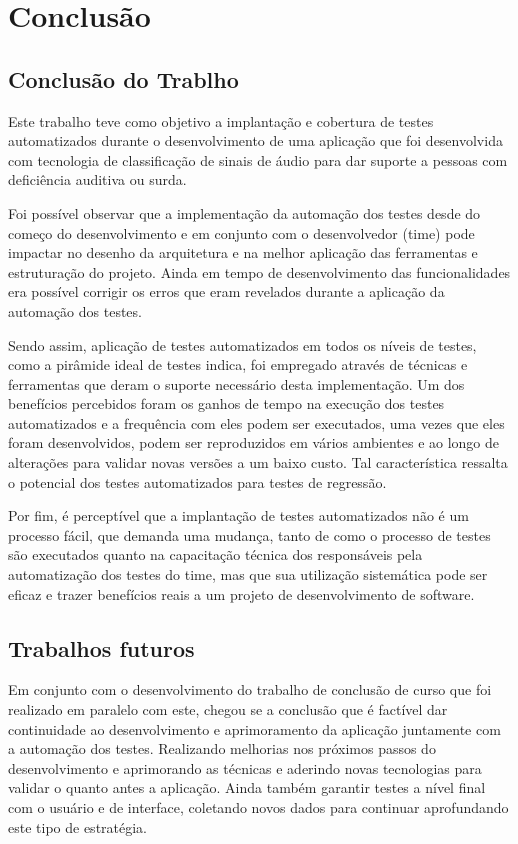 \chapter{Conclusão}



\section{Conclusão do Trablho}

Este trabalho teve como objetivo a implantação e cobertura de testes automatizados durante o desenvolvimento de uma aplicação que foi desenvolvida com tecnologia de classificação de sinais de áudio para dar suporte a pessoas com deficiência auditiva ou surda.

Foi possível observar que a implementação da automação dos testes desde do começo do desenvolvimento e em conjunto com o desenvolvedor (time) pode impactar no desenho da arquitetura e na melhor aplicação das ferramentas e estruturação do projeto. Ainda em tempo de desenvolvimento das funcionalidades era possível corrigir os erros que eram revelados durante a aplicação da automação dos testes.

Sendo assim, aplicação de testes automatizados em todos os níveis de testes, como a pirâmide ideal de testes indica, foi empregado através de técnicas e ferramentas que deram o suporte necessário desta implementação. Um dos benefícios percebidos foram os ganhos de tempo na execução dos testes automatizados e a frequência com eles podem ser executados, uma vezes que eles foram desenvolvidos, podem ser reproduzidos em vários ambientes e ao longo de alterações para validar novas versões a um baixo custo. Tal característica ressalta o potencial dos testes automatizados para testes de regressão.

Por fim,  é perceptível que a implantação de testes automatizados não é um processo fácil, que demanda uma mudança, tanto de como o processo de testes são executados quanto na capacitação  técnica dos responsáveis pela automatização dos testes do time, mas que sua utilização sistemática pode ser eficaz e trazer benefícios reais a um projeto de desenvolvimento de software. 


\section{Trabalhos futuros}

Em conjunto com o desenvolvimento do trabalho de conclusão de curso que foi realizado em paralelo com este, chegou se a conclusão que é factível dar continuidade ao desenvolvimento e aprimoramento da aplicação juntamente com a automação dos testes. Realizando melhorias nos próximos passos do desenvolvimento e aprimorando as técnicas e aderindo novas tecnologias para validar o quanto antes a aplicação. Ainda também garantir testes a nível final com o usuário e de interface, coletando novos dados para continuar aprofundando este tipo de estratégia.
